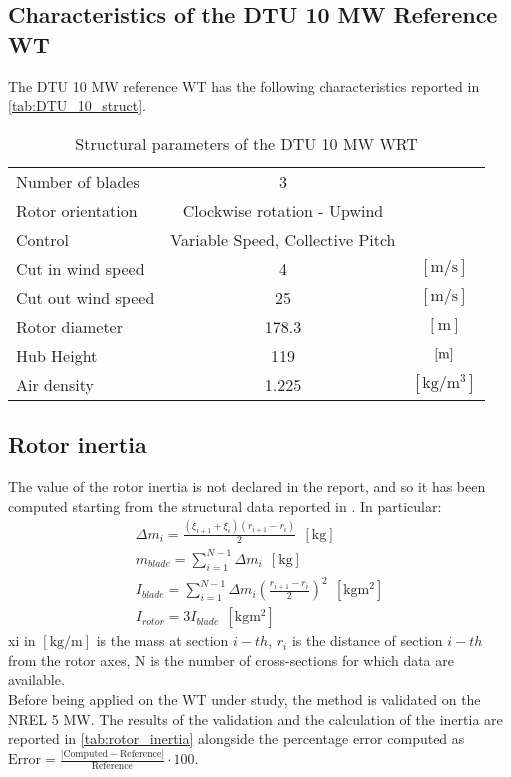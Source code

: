 \subsection{Characteristics of the DTU 10 MW Reference WT}
The DTU 10 MW reference WT has the following characteristics reported in \autoref{tab:DTU_10_struct}.
\begin{table}[htb]
    \caption{Structural parameters of the DTU 10 MW \acrshort{WRT}}
    \centering
    \begin{tabular}{lcc}
    \toprule
    Number of blades & 3 & \\
    Rotor orientation & Clockwise rotation - Upwind & \\
    Control & Variable Speed, Collective Pitch & \\
    Cut in wind speed & 4 & $\left[\si{\meter \per \second}\right]$ \\
    Cut out wind speed & 25 & $\left[\si{\meter \per \second}\right]$ \\
    Rotor diameter & 178.3 & $\left[\si{\meter}\right]$\\
    Hub Height & 119 & $\left[\si{\meter}\right]$\\
    Air density & 1.225 & $\left[\si{\kilo\gram\per\cubic\meter}\right]$\\
    \bottomrule
    \end{tabular}
    \label{tab:DTU_10_struct}
\end{table}

\subsection{Rotor inertia}
The value of the rotor inertia is not declared in the report, and so it has been computed starting from the structural data reported in \cite{DTU_Wind_Energy_Report-I-0092}. In particular:
\begin{gather}
    \Delta m_i=\frac{\left(\xi_{i+1} + \xi_i\right)\left(r_{i+1} - r_i\right)}{2} \ \ \left[\si{\kilo\gram}\right] \\
    m_{blade} = \sum_{i=1}^{N-1}\Delta m_i \ \ \left[\si{\kilo\gram}\right]\\
    I_{blade}=\sum_{i=1}^{N-1}\Delta m_i\left(\frac{r_{i+1} - r_i}{2}\right)^2 \ \ \left[\si{\kilo\gram\square\meter}\right]\\
    I_{rotor}=3I_{blade} \ \ \left[\si{\kilo\gram\square\meter}\right]
\end{gather}
\acrshort{xi} in $ \left[\si{\kilo\gram\per\meter}\right]$ is the mass at section $i-th$, $r_i$ is the distance of section $i-th$ from the rotor axes, \acrshort{N} is the number of cross-sections for which data are available.\\
Before being applied on the \acrshort{WT} under study, the method is validated on the NREL 5 MW. The results of the validation and the calculation of the inertia are reported in \autoref{tab:rotor_inertia} alongside the percentage error computed as $\text{Error}=\frac{ |\text{Computed} - \text{Reference}| }{\text{Reference}}\cdot 100$.

